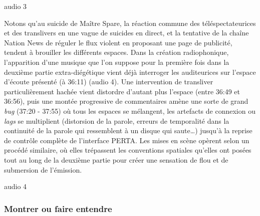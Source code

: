 \documentclass[
]{article}
\begin{document}
audio 3

\label{audio-3}

Notons qu'au suicide de Maître Spare, la réaction commune des téléspectateurices et des translivers en une vague de suicides en direct, et la tentative de la chaîne Nation News de réguler le flux violent en proposant une page de publicité, tendent à brouiller les différents espaces. Dans la création radiophonique, l'apparition d'une musique que l'on suppose pour la première fois dans la deuxième partie extra-diégétique vient déjà interroger les auditeurices sur l'espace d'écoute présenté (à 36:11) (audio 4). Une intervention de transliver particulièrement hachée vient distordre d'autant plus l'espace (entre 36:49 et 36:56), puis une montée progressive de commentaires amène une sorte de grand \emph{bug} (37:20 - 37:55) où tous les espaces se mélangent, les artefacts de connexion ou \emph{lags} se multiplient (distorsion de la parole, erreurs de temporalité dans la continuité de la parole qui ressemblent à un disque qui saute\ldots) jusqu'à la reprise de contrôle complète de l'interface PERTA. Les mises en scène opèrent selon un procédé similaire, où elles trépassent les conventions spatiales qu'elles ont posées tout au long de la deuxième partie pour créer une sensation de flou et de submersion de l'émission.

audio 4

\label{audio-4}

\subsubsection{Montrer ou faire entendre}\label{montrer-ou-faire-entendre}
\end{document}
